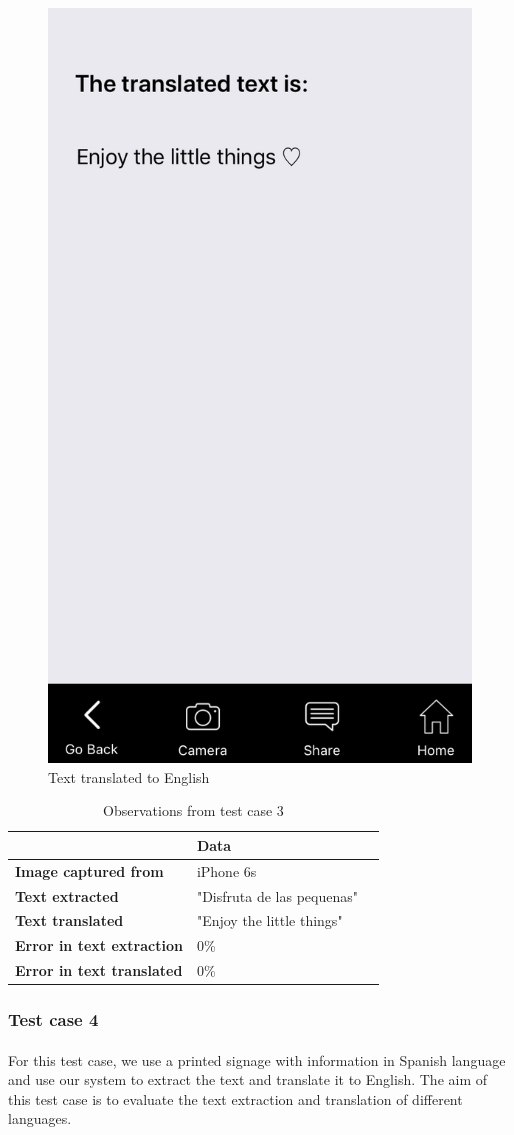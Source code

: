 \documentclass[12pt]{article}
\begin{document}
       \begin{figure}[H]
	\centering
	\includegraphics[width=0.5\linewidth]{media/case3-eng.PNG}
	\caption{Text translated to English}
	\label{fig:eng}
\end{figure} 


\begin{table}%
    \centering
    \caption{Observations from test case 3} 
    \label{my-label3}
       \begin{tabular}{|p{30mm}|p{55mm}|p{35mm}|}
 \hline
  & \textbf{Data}  \\ [0.5ex] 
 \hline\hline
 \textbf{Image captured from} & iPhone 6s  \\
 \hline
  \textbf{Text extracted} & "Disfruta de las pequenas" \\
 \hline
 \textbf{Text translated} & "Enjoy the little things"   \\
 \hline
 \textbf{Error in text extraction} & 0\%   \\
 \hline
 \textbf{Error in text translated} & 0\%   \\ [1ex] 
 \hline
    \end{tabular}
\end{table}

\subsubsection{Test case 4}
\label{threefour}
\paragraph{}For this test case, we use a printed signage with information in Spanish language and use our system to extract the text and translate it to English. The aim of this test case is to evaluate the text extraction and translation of different languages. 
\end{document}
